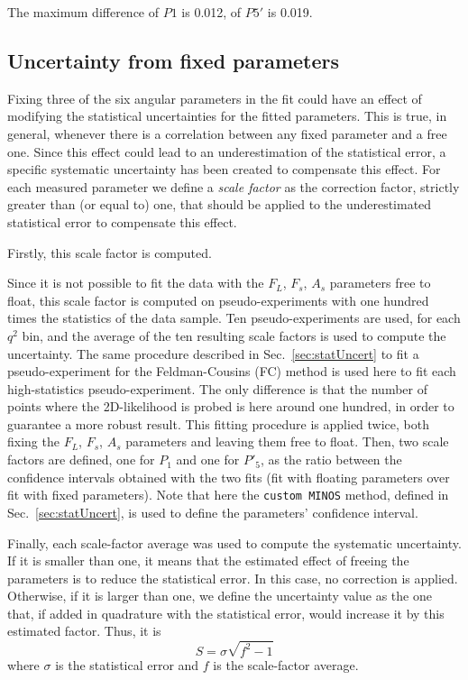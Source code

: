 The maximum difference of $P1$ is 0.012, of $P5'$ is 0.019.

\subsection{Uncertainty from fixed \pdf parameters}
\label{sec:sys-fixedparm}

Fixing three of the six angular parameters in the fit could have an effect of modifying the statistical uncertainties for the fitted parameters.
This is true, in general, whenever there is a correlation between any fixed parameter and a free one.
Since this effect could lead to an underestimation of the statistical error, a specific systematic uncertainty has been created to compensate this effect.
For each measured parameter we define a \textit{scale factor} as the correction factor, strictly greater than (or equal to) one, that should be applied to the underestimated statistical error to compensate this effect. 

Firstly, this scale factor is computed.

Since it is not possible to fit the data with the $F_L$, $F_s$, $A_s$ parameters free to float, this scale factor is computed on pseudo-experiments with one hundred times the statistics of the data sample.
Ten pseudo-experiments are used, for each $q^2$ bin, and the average of the ten resulting scale factors is used to compute the uncertainty.
The same procedure described in Sec.~\ref{sec:statUncert} to fit a pseudo-experiment for the Feldman-Cousins (FC) method is used here to fit each high-statistics pseudo-experiment.
The only difference is that the number of points where the 2D-likelihood is probed is here around one hundred, in order to guarantee a more robust result.
This fitting procedure is applied twice, both fixing the $F_L$, $F_s$, $A_s$ parameters and leaving them free to float.
Then, two scale factors are defined, one for $P_1$ and one for $P'_5$, as the ratio between the confidence intervals obtained with the two fits (fit with floating parameters over fit with fixed parameters).
Note that here the {\tt custom MINOS} method, defined in Sec.~\ref{sec:statUncert}, is used to define the parameters' confidence interval.

Finally, each scale-factor average was used to compute the systematic uncertainty.
If it is smaller than one, it means that the estimated effect of freeing the parameters is to reduce the statistical error.
In this case, no correction is applied.
Otherwise, if it is larger than one, we define the uncertainty value as the one that, if added in quadrature with the statistical error, would increase it by this estimated factor.
Thus, it is
\begin{equation} \label{eq:fix.syst.def}
S = \sigma \sqrt{f^2-1}
\end{equation}
where $\sigma$ is the statistical error and $f$ is the scale-factor average.

